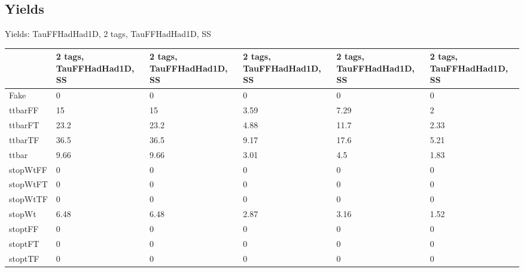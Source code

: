 
\subsection{Yields}

\begin{frame}{Yields: TauFFHadHad1D, 2 tags, TauFFHadHad1D, SS}
\begin{center}
  \begin{tabular}{l| >{\centering\let\newline\\\arraybackslash\hspace{0pt}}m{1.4cm}| >{\centering\let\newline\\\arraybackslash\hspace{0pt}}m{1.4cm}| >{\centering\let\newline\\\arraybackslash\hspace{0pt}}m{1.4cm}| >{\centering\let\newline\\\arraybackslash\hspace{0pt}}m{1.4cm}| >{\centering\let\newline\\\arraybackslash\hspace{0pt}}m{1.4cm}}
    & 2 tags, TauFFHadHad1D, SS & 2 tags, TauFFHadHad1D, SS & 2 tags, TauFFHadHad1D, SS & 2 tags, TauFFHadHad1D, SS & 2 tags, TauFFHadHad1D, SS \\
 \hline \hline
    Fake& 0 & 0 & 0 & 0 & 0 \\
 \hline
    ttbarFF& 15 & 15 & 3.59 & 7.29 & 2 \\
 \hline
    ttbarFT& 23.2 & 23.2 & 4.88 & 11.7 & 2.33 \\
 \hline
    ttbarTF& 36.5 & 36.5 & 9.17 & 17.6 & 5.21 \\
 \hline
    ttbar& 9.66 & 9.66 & 3.01 & 4.5 & 1.83 \\
 \hline
    stopWtFF& 0 & 0 & 0 & 0 & 0 \\
 \hline
    stopWtFT& 0 & 0 & 0 & 0 & 0 \\
 \hline
    stopWtTF& 0 & 0 & 0 & 0 & 0 \\
 \hline
    stopWt& 6.48 & 6.48 & 2.87 & 3.16 & 1.52 \\
 \hline
    stoptFF& 0 & 0 & 0 & 0 & 0 \\
 \hline
    stoptFT& 0 & 0 & 0 & 0 & 0 \\
 \hline
    stoptTF& 0 & 0 & 0 & 0 & 0 \\

\end{tabular}
\end{center}
\end{frame}
